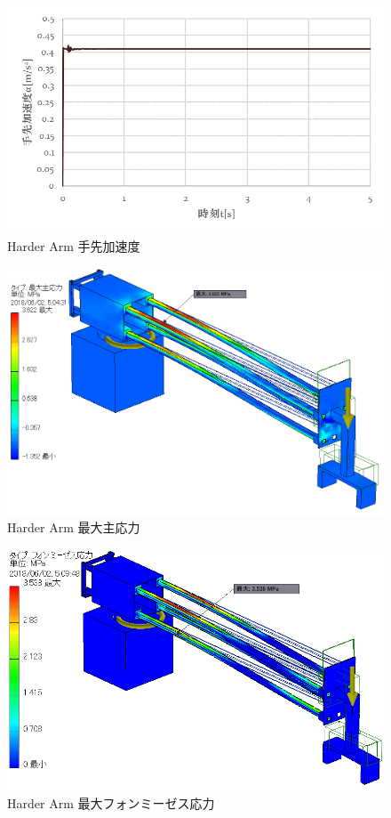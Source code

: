 \documentclass[10pt,b5paper,papersize,dvipdfmx]{jsbook}
\begin{document}
\begin{figure}[htbp]
  \centering
  \includegraphics[width=12cm]{img/robot17.png}
  \caption{Harder Arm 手先加速度}
  \label{fig:Harder Arm 手先加速度}
\end{figure}
\begin{figure}[htbp]
  \centering
  \includegraphics[width=12cm]{img/robot18.png}
  \caption{Harder Arm 最大主応力}
  \label{fig:Harder Arm 最大主応力}
\end{figure}
\begin{figure}[htbp]
  \centering
  \includegraphics[width=12cm]{img/robot19.png}
  \caption{Harder Arm 最大フォンミーゼス応力}
  \label{fig:Harder Arm 最大フォンミーゼス応力}
\end{figure}
\end{document}
